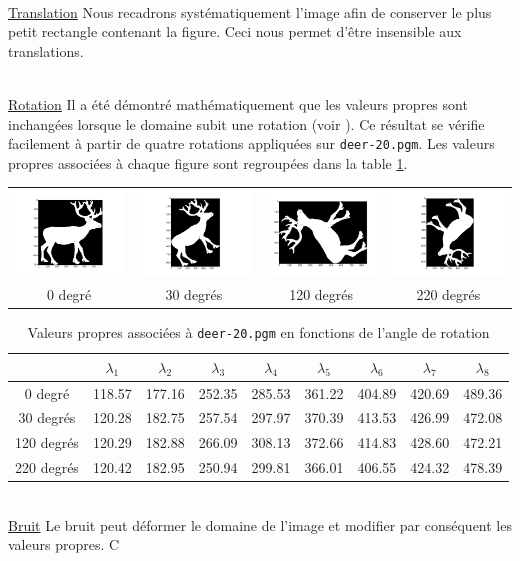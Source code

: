 \documentclass[a4paper,10pt]{article} %
\theoremstyle{definition} %
\begin{document}
~\\
\underline{Translation} Nous recadrons systématiquement l'image afin de conserver le plus petit rectangle contenant la figure. Ceci nous permet d'être insensible aux translations.

~\\
\underline{Rotation} Il a été démontré mathématiquement que les valeurs propres sont inchangées lorsque le domaine subit une rotation (voir \cite{Zuliani04}). Ce résultat se vérifie facilement à partir de quatre rotations appliquées sur \texttt{deer-20.pgm}. Les valeurs propres associées à chaque figure sont regroupées dans la table \ref{rot}.

\begin{center}
  \begin{tabular}{c c c c}
    \includegraphics[scale=0.15]{rotate/0.png} & \includegraphics[scale=0.15]{rotate/30.png} & \includegraphics[scale=0.15]{rotate/120.png} & \includegraphics[scale=0.15]{rotate/220.png} \\
    0 degré & 30 degrés & 120 degrés & 220 degrés
  \end{tabular}
\end{center}

\begin{table}[H]
  \begin{center}
    \begin{tabular}{c | c c c c c c c c}
                & $\lambda_1$ & $\lambda_2$ & $\lambda_3$ & $\lambda_4$ & $\lambda_5$ & $\lambda_6$ & $\lambda_7$ & $\lambda_8$ \\ \hline
      0 degré    & 118.57 & 177.16 & 252.35 & 285.53 & 361.22 & 404.89 & 420.69 & 489.36 \\
      30 degrés  & 120.28 & 182.75 & 257.54 & 297.97 & 370.39 & 413.53 & 426.99 & 472.08 \\
      120 degrés & 120.29 & 182.88 & 266.09 & 308.13 & 372.66 & 414.83 & 428.60 & 472.21 \\
      220 degrés & 120.42 & 182.95 & 250.94 & 299.81 & 366.01 & 406.55 & 424.32 & 478.39 
    \end{tabular}
  \end{center}
  \caption{Valeurs propres associées à \texttt{deer-20.pgm} en fonctions de l'angle de rotation}
  \label{rot}
\end{table}

~\\
\underline{Bruit} Le bruit peut déformer le domaine de l'image et modifier par conséquent les valeurs propres. C
\end{document}
